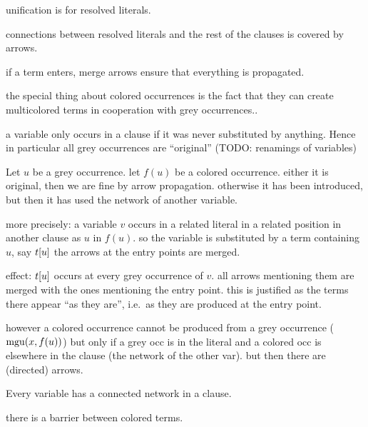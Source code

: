 \documentclass[,%
	paper=a4,%
	DIV10, %
	twoside=false,%
	liststotoc,
	bibtotoc,
	draft=false,%
	numbers=noendperiod
]{scrartcl}
\begin{document}
\newcommand{\lif}[1]{\lift{\Delta}{#1}{x}}
\newcommand{\newterm}{^*}
\newcommand{\de}{^\Delta}

unification is for resolved literals.

connections between resolved literals and the rest of the clauses is covered by arrows.

if a term enters, merge arrows ensure that everything is propagated.

the special thing about colored occurrences is the fact that they can create multicolored terms in cooperation with grey occurrences..

a variable only occurs in a clause if it was never substituted by anything. Hence in particular all grey occurrences are ``original'' (TODO: renamings of variables)

Let $u$ be a grey occurrence.
let $f(u)$ be a colored occurrence.
either it is original, then we are fine by arrow propagation.
otherwise it has been introduced, but then it has used the network of another variable.

more precisely: %
a variable $v$ occurs in a related literal in a related position in another clause as $u$ in $f(u)$.
so the variable is substituted by a term containing $u$, say $t[u]$
the arrows at the entry points are merged.

effect: 
$t[u]$ occurs at every grey occurrence of $v$. all arrows mentioning them are merged with the ones mentioning the entry point.
this is justified as the terms there appear ``as they are'', i.e.\ as they are produced at the entry point.

however a colored occurrence cannot be produced from a grey occurrence ($\operatorname{mgu}(x, f(u))$) but only if a grey occ is in the literal and a colored occ is elsewhere in the clause (the network of the other var). but then there are (directed) arrows.


Every variable has a connected network in a clause. 

there is a barrier between colored terms.

~

~
\end{document}
